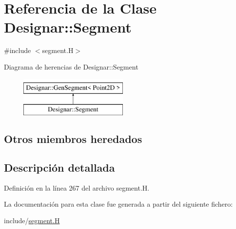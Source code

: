 \hypertarget{class_designar_1_1_segment}{}\section{Referencia de la Clase Designar\+:\+:Segment}
\label{class_designar_1_1_segment}


{\ttfamily \#include $<$segment.\+H$>$}

Diagrama de herencias de Designar\+:\+:Segment\begin{figure}[H]
\begin{center}
\leavevmode
\includegraphics[height=2.000000cm]{class_designar_1_1_segment}
\end{center}
\end{figure}
\subsection*{Otros miembros heredados}


\subsection{Descripción detallada}


Definición en la línea 267 del archivo segment.\+H.



La documentación para esta clase fue generada a partir del siguiente fichero\+:\begin{DoxyCompactItemize}
\item 
include/\hyperlink{segment_8_h}{segment.\+H}\end{DoxyCompactItemize}
